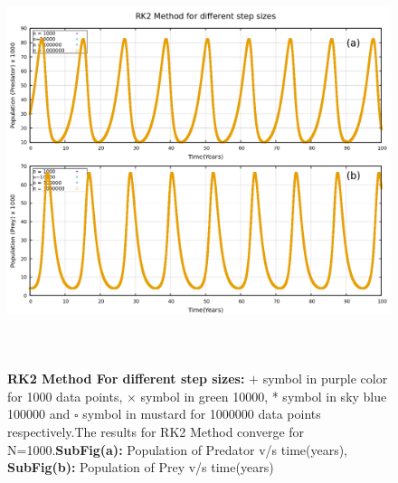 \documentclass[12pt]{article}
\begin{document}
\newpage
\begin{figure}[h] %
    \centering
    \includegraphics[width=15cm,height=12cm]{rk2_diff_h.png}
\caption{\textbf{RK2 Method For different step sizes:} $+$ symbol in purple color for 1000 data points, $\times$ symbol in green 10000, * symbol in sky blue 100000 and $\square$ symbol in mustard for 1000000 data points respectively.The results for RK2 Method converge for N=1000.\newline \textbf{SubFig(a):} Population of Predator v/s time(years), \textbf{SubFig(b):} Population of Prey v/s time(years)  }
\end{figure}
\end{document}
